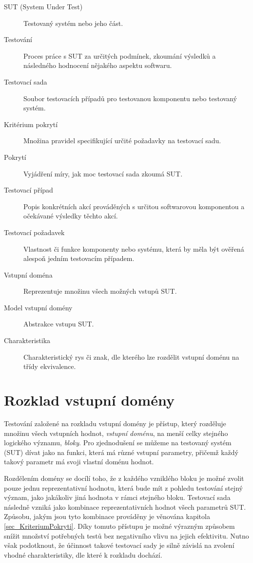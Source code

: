 \begin{description}
	\item[SUT (System Under Test)] Testovaný systém nebo jeho část. 
	\item[Testování] Proces práce s SUT za určitých podmínek, zkoumání výsledků a následného hodnocení nějakého aspektu softwaru. 
	\item[Testovací sada] Soubor testovacích případů pro testovanou komponentu nebo testovaný systém. 
	\item[Kritérium pokrytí] Množina pravidel specifikující určité požadavky na testovací sadu. 
	\item[Pokrytí] Vyjádření míry, jak moc testovací sada zkoumá SUT. 
	\item[Testovací případ] Popis konkrétních akcí prováděných s určitou softwarovou komponentou a očekávané výsledky těchto akcí. 
	\item[Testovací požadavek] Vlastnost či funkce komponenty nebo systému, která by měla být ověřená alespoň jedním testovacím případem. 
	\item[Vstupní doména] Reprezentuje množinu všech možných vstupů SUT. 
	\item[Model vstupní domény] Abstrakce vstupu SUT. 
	\item[Charakteristika] Charakteristický rys či znak, dle kterého lze rozdělit vstupní doménu na třídy ekvivalence. 
\end{description}

\section{Rozklad vstupní domény}
\label{sec_RozkladVstupniDomeny}

Testování založené na rozkladu vstupní domény je přístup, který rozděluje množinu všech vstupních hodnot, \textit{vstupní doménu}, na menší celky stejného logického významu, \textit{bloky}. Pro zjednodušení se můžeme na testovaný systém (SUT) dívat jako na funkci, která má různé vstupní parametry, přičemž každý takový parametr má svoji vlastní doménu hodnot. 

Rozdělením domény se docílí toho, že z každého vzniklého bloku je možné zvolit pouze jednu reprezentativní hodnotu, která bude mít z pohledu testování stejný význam, jako jakákoliv jiná hodnota v rámci stejného bloku. Testovací sada následně vzniká jako kombinace reprezentativních hodnot všech parametrů SUT. Způsobu, jakým jsou tyto kombinace prováděny je věnována kapitola \ref{sec_KriteriumPokryti}. Díky tomuto přístupu je možné výrazným způsobem snížit množství potřebných testů bez negativního vlivu na jejich efektivitu. Nutno však podotknout, že účinnost takové testovací sady je silně závislá na zvolení vhodné charakteristiky, dle které k rozkladu dochází.  


